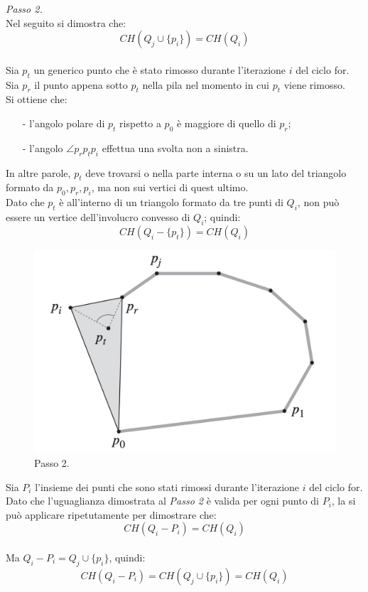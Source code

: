 \documentclass[12pt,a4paper]{report}
\begin{document}
\pagebreak

\noindent \textit{Passo 2.}\\
Nel seguito si dimostra che:
\[ CH(Q_j \cup \{p_i\}) = CH(Q_i)\]\\
Sia $p_t$ un generico punto che è stato rimosso durante l'iterazione $i$ del ciclo for.\\
Sia $p_r$ il punto appena sotto $p_t$ nella pila nel momento in cui $p_t$ viene rimosso.\\
Si ottiene che:
\begin{itemize}
    \item[-] l'angolo polare di $p_t$ rispetto a $p_0$ è maggiore di quello di $p_r$;
    \item[-] l'angolo $\angle p_rp_tp_i$ effettua una svolta non a sinistra.
\end{itemize}
In altre parole, $p_t$ deve trovarsi o nella parte interna o su un lato del triangolo formato da $p_0, p_r, p_i$, ma non sui vertici di quest ultimo.\\
Dato che $p_t$ è all'interno di un triangolo formato da tre punti di $Q_i$, non può essere un vertice dell'involucro convesso di $Q_i$; quindi:
\[ CH(Q_i - \{p_t\}) = CH(Q_i) \]

\begin{figure}[ht]
    \centering
    \includegraphics[width=0.55\linewidth]{dimStep2.png}
    \caption{Passo 2.}
    \label{fig:dimStep2}
\end{figure}

\noindent Sia $P_i$ l'insieme dei punti che sono stati rimossi durante l'iterazione $i$ del ciclo for.\\
Dato che l'uguaglianza dimostrata al \textit{Passo 2} è valida per ogni punto di $P_i$, la si può applicare ripetutamente per dimostrare che:
\[ CH(Q_i - P_i) = CH(Q_i) \]\\
Ma $Q_i - P_i = Q_j \cup \{p_i\}$, quindi:
\[ CH(Q_i - P_i) = CH(Q_j \cup \{p_i\}) = CH(Q_i) \]\\

\vspace{0.3cm}
\end{document}
